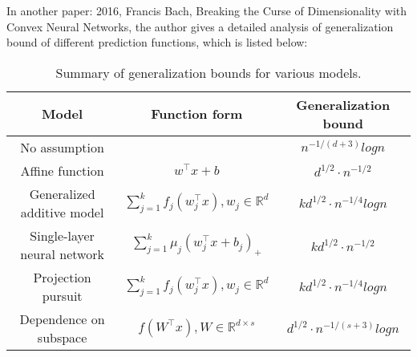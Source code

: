 \documentclass{article}
\begin{document}
In another paper: 2016, Francis Bach, Breaking the Curse of Dimensionality with Convex Neural Networks, the author gives a detailed analysis of generalization bound of different prediction functions, which is listed below:
\begin{table}[htb]
\begin{tabular}{|c|c|c|}
\hline
Model & Function form & Generalization bound\\
\hline
No assumption & & $n^{-1/(d+3)}log n$\\
\hline
Affine function & $w^\top x + b$ & $d^{1/2}\cdot n^{-1/2}$\\
\hline
Generalized additive model & $\sum_{j=1}^{k}f_{j}(w_{j}^\top x),w_{j}\in \mathbb{R}^{d}$ & $k d^{1/2}\cdot n^{-1/4}log n$\\
\hline
Single-layer neural network & $\sum_{j=1}^{k} \mu_{j} (w_{j}^\top x + b_{j})_{+}$ & $k d^{1/2} \cdot n^{-1/2}$\\
\hline
Projection pursuit & $\sum_{j=1}^{k} f_{j}(w_{j}^\top x), w_{j} \in \mathbb{R}^{d}$ & $k d^{1/2}\cdot n^{-1/4}log n$\\
\hline
Dependence on subspace & $f(W^\top x), W \in \mathbb{R}^{d \times s}$ & $d^{1/2}\cdot n^{-1/(s+3)}log n$\\
\hline
\end{tabular}
\caption{Summary of generalization bounds for various models.}
\end{table}
\end{document}
